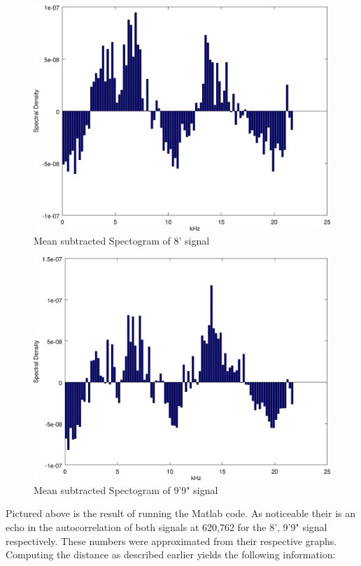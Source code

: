 \documentclass{article}
\begin{document}
      \begin{figure}[H]
         \includegraphics[width=\textheight/2]{images/spec_8.png}
         \caption{Mean subtracted Spectogram of 8' signal}
      \end{figure}
      \begin{figure}[H]
         \includegraphics[width=\textheight/2]{images/spec_9.png}
         \caption{Mean subtracted Spectogram of 9'9" signal}
      \end{figure}
      Pictured above is the result of running the Matlab code.
      As noticeable their is an echo in the autocorrelation of both signals
      at {620,762} for the {8', 9'9"} signal respectively. These
      numbers were approximated from their respective graphs. Computing the
      distance as described earlier yields the following information:
\end{document}
